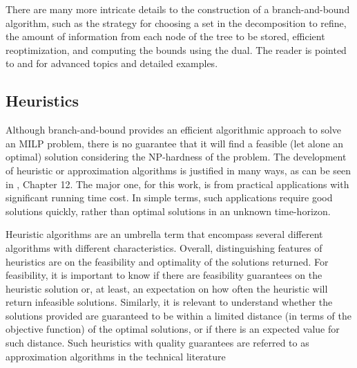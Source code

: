 
There are many more intricate details to the construction of a branch-and-bound algorithm, such as the strategy for choosing a set in the decomposition to refine, the amount of information from each node of the tree to be stored, efficient reoptimization, and computing the bounds using the dual.
The reader is pointed to  and  for advanced topics and detailed examples.


\subsection{Heuristics}

Although branch-and-bound provides an efficient algorithmic approach to solve an MILP problem, there is no guarantee that it will find a feasible (let alone an optimal) solution considering the NP-hardness of the problem.
The development of heuristic or approximation algorithms is justified in many ways, as can be seen in , Chapter 12.
The major one, for this work, is from practical applications with significant running time cost.
In simple terms, such applications require good solutions quickly, rather than optimal solutions in an unknown time-horizon.

Heuristic algorithms are an umbrella term that encompass several different algorithms with different characteristics.
Overall, distinguishing features of heuristics are on the feasibility and optimality of the solutions returned.
For feasibility, it is important to know if there are feasibility guarantees on the heuristic solution or, at least, an expectation on how often the heuristic will return infeasible solutions.
Similarly, it is relevant to understand whether the solutions provided are guaranteed to be within a limited distance (in terms of the objective function) of the optimal solutions, or if there is an expected value for such distance. 
Such heuristics with quality guarantees are referred to as approximation algorithms in the technical literature

